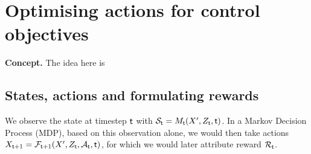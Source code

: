 \chapter{\sffamily Optimising actions for control objectives}

{\bfseries\sffamily Concept.} The idea here is 

\section{\sffamily States, actions and formulating rewards}

We observe the state at timestep ${\sf t}$ with ${\cal S}_{{\sf t}} = M_{{\sf t}}(X', Z_{\sf t}, {\sf t})$. In a Markov Decision Process (MDP), based on this observation alone, we would then take actions $X_{{\sf t}+1} = {\cal F}_{{\sf t}+1}(X',Z_{\sf t},{\cal A}_{\sf t},{\sf t})$, for which we would later attribute reward ${\cal R}_{{\sf t}}$.
